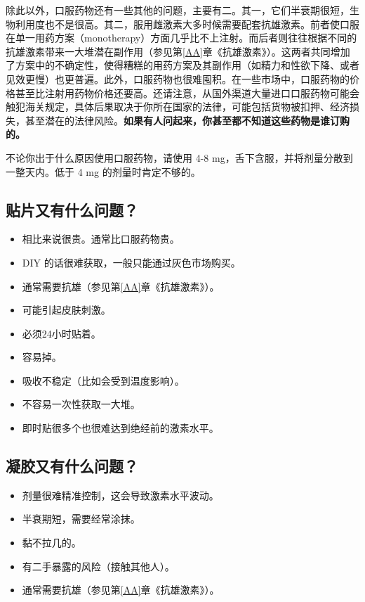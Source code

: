 \documentclass{article}
\begin{document}
除此以外，口服药物还有一些其他的问题，主要有二。其一，它们半衰期很短，生物利用度也不是很高。其二，服用雌激素大多时候需要配套抗雄激素。前者使口服在单一用药方案（monotherapy）方面几乎比不上注射。而后者则往往根据不同的抗雄激素带来一大堆潜在副作用（参见第\ref{AA}章《抗雄激素》）。这两者共同增加了方案中的不确定性，使得糟糕的用药方案及其副作用（如精力和性欲下降、或者见效更慢）也更普遍。此外，口服药物也很难囤积。在一些市场中，口服药物的价格甚至比注射用药物价格还要高。还请注意，从国外渠道大量进口口服药物可能会触犯海关规定，具体后果取决于你所在国家的法律，可能包括货物被扣押、经济损失，甚至潜在的法律风险。\textbf{如果有人问起来，你甚至都不知道这些药物是谁订购的。}

不论你出于什么原因使用口服药物，请使用 4-8 mg，舌下含服，并将剂量分散到一整天内。低于 4 mg 的剂量时肯定不够的。

\subsection{贴片又有什么问题？}

\begin{itemize}
  \item 相比来说很贵。通常比口服药物贵。
  \item DIY 的话很难获取，一般只能通过灰色市场购买。
  \item 通常需要抗雄（参见第\ref{AA}章《抗雄激素》）。
  \item 可能引起皮肤刺激。
  \item 必须24小时贴着。
  \item 容易掉。
  \item 吸收不稳定（比如会受到温度影响）。
  \item 不容易一次性获取一大堆。
  \item 即时贴很多个也很难达到绝经前的激素水平。
\end{itemize}

\subsection{凝胶又有什么问题？}

\begin{itemize}
  \item 剂量很难精准控制，这会导致激素水平波动。
  \item 半衰期短，需要经常涂抹。
  \item 黏不拉几的。
  \item 有二手暴露的风险（接触其他人）。
  \item 通常需要抗雄（参见第\ref{AA}章《抗雄激素》）。
\end{itemize}
\end{document}
